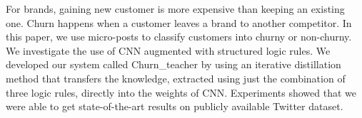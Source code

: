 For brands, gaining new customer is more expensive than keeping an existing one. Churn happens when a customer leaves a brand to another competitor. In this paper, we use micro-posts to classify customers into churny or non-churny. We investigate the use of CNN augmented with structured logic rules. We developed our system called Churn\_teacher by using an iterative distillation method that transfers the knowledge, extracted using just the combination of three logic rules, directly into the weights of CNN. Experiments showed that we were able to get state-of-the-art results on publicly available Twitter dataset.
